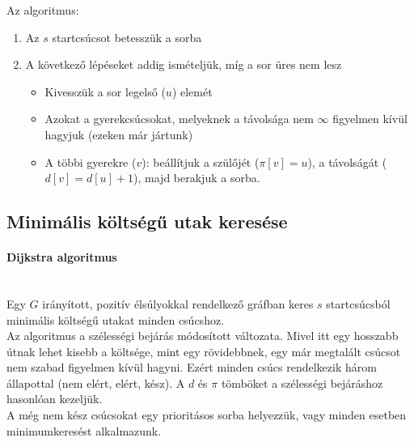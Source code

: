 \documentclass[margin=0px]{article}
\begin{document}
	\noindent Az algoritmus:
	\begin{enumerate}
		\item Az $s$ startcsúcsot betesszük a sorba
		\item A következő lépéseket addig ismételjük, míg a sor üres nem lesz
        \begin{itemize}
		  \item Kivesszük a sor legelső ($u$) elemét
		  \item Azokat a gyerekcsúcsokat, melyeknek a távolsága nem $\infty$ figyelmen kívül hagyjuk (ezeken már jártunk)
		  \item A többi gyerekre ($v$): beállítjuk a szülőjét ($\pi[v] = u$), a távolságát ($d[v] = d[u]+1$), majd berakjuk a sorba.
        \end{itemize}
	\end{enumerate}

	\subsection*{Minimális költségű utak keresése}

	\paragraph*{Dijkstra algoritmus\\\\}
	
    \noindent Egy $G$ irányított, pozitív élsúlyokkal rendelkező gráfban keres $s$ startcsúcsból minimális költségű utakat minden csúcshoz.\\
					
    \noindent Az algoritmus a szélességi bejárás módosított változata. Mivel itt egy hosszabb útnak lehet kisebb a költsége, mint egy rövidebbnek, egy már megtalált csúcsot nem szabad figyelmen kívül hagyni. Ezért minden csúcs rendelkezik három állapottal (nem elért, elért, kész). A $d$ és $\pi$ tömböket a szélességi bejáráshoz hasonlóan kezeljük.\\
					
	\noindent A még nem kész csúcsokat egy prioritásos sorba helyezzük, vagy minden esetben minimumkeresést alkalmazunk.\\
\end{document}
